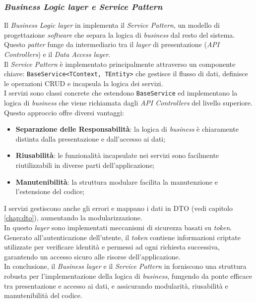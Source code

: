 \subsubsection{\textit{Business Logic layer e Service Pattern}}

Il \textit{Business Logic layer} in {\movi} implementa il \textit{Service Pattern}, un modello di progettazione 
\textit{software} che separa la logica di \textit{business} dal resto del sistema. Questo \textit{patter} funge 
da intermediario tra il \textit{layer} di presentazione (\textit{API Controllers}) e il \textit{Data Access layer}.\\
Il \textit{Service Pattern} è implementato principalmente attraverso un componente chiave: \texttt{BaseService<TContext, TEntity>} 
che gestisce il flusso di dati, definisce le operazioni CRUD e incapsula la logica dei servizi.\\
I servizi sono classi concrete che estendono \texttt{BaseService} ed implementano la logica di \textit{business} 
che viene richiamata dagli \textit{API Controllers} del livello superiore.\\
Questo approccio offre diversi vantaggi:
\begin{itemize}
\item \textbf{Separazione delle Responsabilità}: la logica di \textit{business} è chiaramente distinta dalla 
      presentazione e dall'accesso ai dati;
\item \textbf{Riusabilità}: le funzionalità incapsulate nei servizi sono facilmente riutilizzabili in diverse 
      parti dell'applicazione;
\item \textbf{Manutenibilità}: la struttura modulare facilita la manutenzione e l'estensione del codice;
\end{itemize}
I servizi gestiscono anche gli errori e mappano i dati in DTO (vedi capitolo \ref{chap:dto}), aumentando la 
modularizzazione.\\
In questo \textit{layer} sono implementati meccanismi di sicurezza basati su \textit{token}. Generato all'autenticazione 
dell'utente, il \textit{token} contiene informazioni criptate utilizzate per verificare identità e permessi ad ogni richiesta 
successiva, garantendo un accesso sicuro alle risorse dell'applicazione.\\
In conclusione, il \textit{Business layer} e il \textit{Service Pattern} in {\movi} forniscono una struttura robusta 
per l'implementazione della logica di \textit{business}, fungendo da ponte efficace tra presentazione e accesso ai 
dati, e assicurando modularità, riusabilità e manutenibilità del codice.